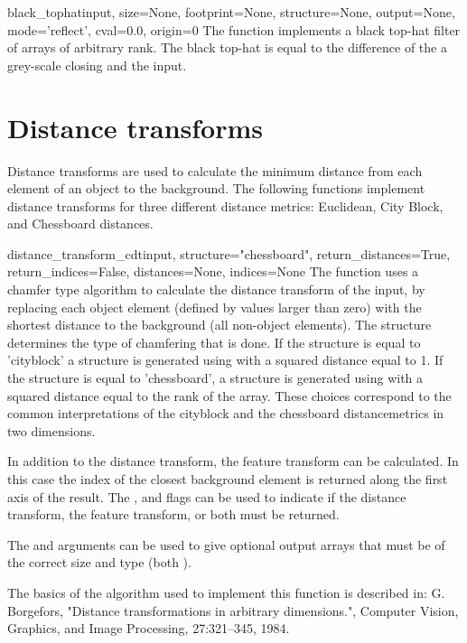 \begin{funcdesc}{black_tophat}{input, size=None, footprint=None, 
    structure=None, output=None, mode='reflect', cval=0.0, origin=0} The
   function implements a black top-hat filter of 
  arrays of arbitrary rank. The black top-hat is equal to the difference of 
  the a grey-scale closing and the input.
\end{funcdesc}

\section{Distance transforms}
\label{sec:ndimage:grey-morphology}
Distance transforms are used to calculate the minimum distance from each
element of an object to the background. The following functions implement
distance transforms for three different distance metrics: Euclidean, City
Block, and Chessboard distances.

\begin{funcdesc}{distance_transform_cdt}{input, structure="chessboard",
  return_distances=True, return_indices=False, distances=None, 
  indices=None} The function  uses a 
  chamfer type algorithm to calculate the distance transform of the input, 
  by replacing each object element (defined by values larger than zero) 
  with the shortest distance to the background (all non-object elements). 
  The structure determines the type of chamfering that is done. If the 
  structure is equal to 'cityblock' a structure is generated using 
   with a squared distance equal to 1. 
  If the structure is equal to 'chessboard', a structure is generated using 
   with a squared distance equal to the 
  rank of the array. These choices correspond to the common interpretations 
  of the cityblock and the chessboard distancemetrics in two dimensions.
  
  In addition to the distance transform, the feature transform can be
  calculated. In this case the index of the closest background element is
  returned along the first axis of the result.  The , 
  and  flags can be used to indicate if the distance 
  transform, the feature transform, or both must be returned.
  
  The  and  arguments can be used to give 
  optional output arrays that must be of the correct size and type (both
  ).

  The basics of the algorithm used to implement this function is described
  in: G. Borgefors, "Distance transformations in arbitrary dimensions.",
  Computer Vision, Graphics, and Image Processing, 27:321--345, 1984.
\end{funcdesc}

